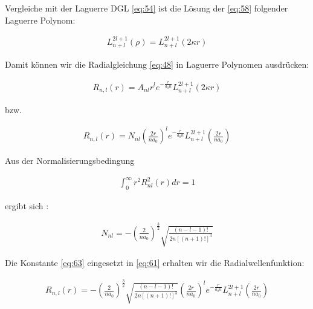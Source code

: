 Vergleiche mit der Laguerre DGL \eqref{eq:54} ist die Lösung der \eqref{eq:58} folgender Laguerre Polynom:

\begin{align}
  \label{eq:59}
  L^{2l+1}_{n+l}\left(\rho\right) = L^{2l+1}_{n+l}\left(2\kappa r \right)
\end{align}

Damit können wir die Radialgleichung \eqref{eq:48} in Laguerre Polynomen ausdrücken:


\begin{align}
  \label{eq:60}
  R_{n,l}(r) = A_{nl}r^{l}e^{-\frac{r}{a_0 n}} L^{2l+1}_{n+l}\left(2\kappa r \right)
\end{align}

bzw.

\begin{align}
  \label{eq:61}
   R_{n,l}(r) = N_{nl}\left(\frac{2r}{n a_0}\right)^{l}e^{-\frac{r}{a_0 n}} L^{2l+1}_{n+l}\left(\frac{2r}{n a_0}\right)
\end{align}

Aus der Normalisierungsbedingung 

\begin{align}
  \label{eq:62}
  \int^\infty_0 r^2 R^2_{nl} (r) dr = 1
\end{align}

ergibt sich :

\begin{align}
  \label{eq:63}
  N_{nl} = -\left(\frac{2}{na_0}\right)^{\frac{3}{2}}\sqrt{\frac{(n-l-1)!}{2n[(n+1)!]^3} }
\end{align}

Die Konstante \eqref{eq:63} eingesetzt in \eqref{eq:61} erhalten wir die Radialwellenfunktion:

\begin{align}
  \label{eq:64}
 \boxed{ R_{n,l}(r) = -\left(\frac{2}{na_0}\right)^{\frac{3}{2}}\sqrt{\frac{(n-l-1)!}{2n[(n+1)!]^3} } \left(\frac{2r}{n a_0}\right)^{l}e^{-\frac{r}{a_0 n}} L^{2l+1}_{n+l}\left(\frac{2r}{n a_0}\right)}
\end{align}




